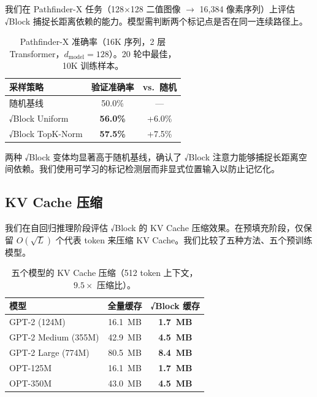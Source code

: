 \documentclass[11pt,a4paper,fontset=mac]{ctexart}
\begin{document}
我们在 Pathfinder-X 任务（128$\times$128 二值图像 $\rightarrow$ 16,384 像素序列）上评估 √Block 捕捉长距离依赖的能力。模型需判断两个标记点是否在同一连续路径上。

\begin{table}[h]
\centering
\caption{Pathfinder-X 准确率（16K 序列，2 层 Transformer，$d_{\text{model}}=128$）。20 轮中最佳，10K 训练样本。}
\label{tab:lra}
\begin{tabular}{lcc}
\toprule
采样策略 & 验证准确率 & vs.\ 随机 \\
\midrule
随机基线 & 50.0\% & --- \\
√Block Uniform  & \textbf{56.0\%} & +6.0\% \\
√Block TopK-Norm & \textbf{57.5\%} & +7.5\% \\
\bottomrule
\end{tabular}
\end{table}

两种 √Block 变体均显著高于随机基线，确认了 √Block 注意力能够捕捉长距离空间依赖。我们使用可学习的标记检测层而非显式位置输入以防止记忆化。

\subsection{KV Cache 压缩}

我们在自回归推理阶段评估 √Block 的 KV Cache 压缩效果。在预填充阶段，仅保留 $O(\sqrt{L})$ 个代表 token 来压缩 KV Cache。我们比较了五种方法、五个预训练模型。

\begin{table}[h]
\centering
\caption{五个模型的 KV Cache 压缩（512 token 上下文，$9.5\times$ 压缩比）。}
\label{tab:kv}
\begin{tabular}{lcc}
\toprule
模型 & 全量缓存 & √Block 缓存 \\
\midrule
GPT-2 (124M)      & 16.1~MB & \textbf{1.7~MB} \\
GPT-2 Medium (355M) & 42.9~MB & \textbf{4.5~MB} \\
GPT-2 Large (774M)  & 80.5~MB & \textbf{8.4~MB} \\
OPT-125M            & 16.1~MB & \textbf{1.7~MB} \\
OPT-350M            & 43.0~MB & \textbf{4.5~MB} \\
\bottomrule
\end{tabular}
\end{table}
\end{document}
